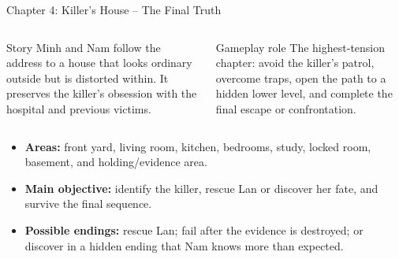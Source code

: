 \documentclass[aspectratio=169,10pt]{beamer}
\begin{document}
\begin{frame}{Chapter 4: Killer's House -- The Final Truth}
  \begin{columns}[T,onlytextwidth]
    \begin{block}{Story}
      Minh and Nam follow the address to a house that looks ordinary outside but is distorted within. It preserves the killer's obsession with the hospital and previous victims.
    \end{block}
    \begin{block}{Gameplay role}
      The highest-tension chapter: avoid the killer's patrol, overcome traps, open the path to a hidden lower level, and complete the final escape or confrontation.
    \end{block}
  \end{columns}

  \vspace{0.2cm}
  \begin{itemize}
    \item \textbf{Areas:} front yard, living room, kitchen, bedrooms, study, locked room, basement, and holding/evidence area.
    \item \textbf{Main objective:} identify the killer, rescue Lan or discover her fate, and survive the final sequence.
    \item \textbf{Possible endings:} rescue Lan; fail after the evidence is destroyed; or discover in a hidden ending that Nam knows more than expected.
  \end{itemize}
\end{frame}
\end{document}
